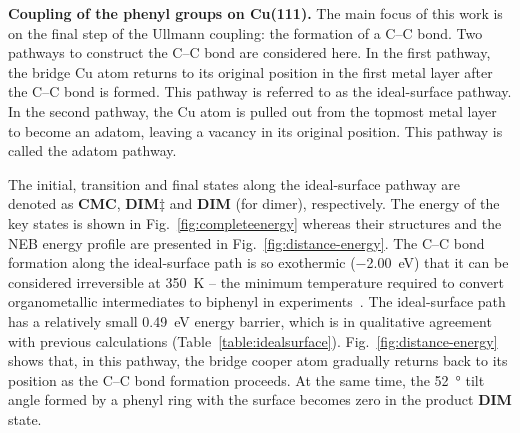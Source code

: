 \documentclass[aps,prb,reprint,amsmath,amssymb]{revtex4-1}
\newcommand{\lock}{\color{red}}
\newcommand{\lock}{\color{black}}
\begin{document}
{\lock
\textbf{Coupling of the phenyl groups on Cu(111).} The main focus of this work is on the final step of the Ullmann coupling: the formation of a C--C bond. 
Two pathways to construct the C--C bond are considered here. 
In the first pathway, the bridge Cu atom returns to its original position in the first metal layer after the C--C bond is formed. This pathway is referred to as the ideal-surface pathway.
In the second pathway, the Cu atom is pulled out from the topmost metal layer to become an adatom, leaving a vacancy in its original position. This pathway is called the adatom pathway.

The initial, transition and final states along the ideal-surface pathway are denoted as \textbf{CMC}, \textbf{DIM$\ddagger$} and \textbf{DIM} (for dimer), respectively.
The energy of the key states is shown in Fig.~\ref{fig:completeenergy} whereas their structures and the NEB energy profile are presented in Fig.~\ref{fig:distance-energy}. 
The C--C bond formation along the ideal-surface path is so exothermic (\SI{-2.00}{\electronvolt}) that it can be considered irreversible at \SI{350}{\kelvin} -- the minimum temperature required to convert organometallic intermediates to biphenyl in experiments~\cite{ullmann_67, sur_sci01}. The ideal-surface path has a relatively small \SI{0.49}{\electronvolt} energy barrier, which is in qualitative agreement with previous calculations (Table~\ref{table:idealsurface}). %
Fig.~\ref{fig:distance-energy} shows that, in this pathway, the bridge cooper atom gradually returns back to its position as the C--C bond formation proceeds. At the same time, the \SI{52}{\degree} tilt angle formed by a phenyl ring with the surface becomes zero in the product \textbf{DIM} state.

}
\end{document}
